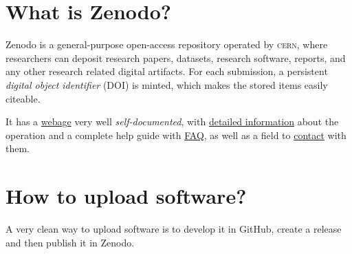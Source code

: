 \section{What is \textsf{Zenodo}?}

Zenodo is a general-purpose open-access repository operated by \textsc{cern}, where researchers can deposit research papers, datasets, research software, reports, and any other research related digital artifacts. For each submission, a persistent \textit{digital object identifier} (DOI) is minted, which makes the stored items easily citeable.

It has a \href{https://zenodo.org/}{webage} very well \textit{self-documented}, with \href{https://about.zenodo.org/}{detailed information} about the operation and a complete help guide with \href{https://help.zenodo.org/}{FAQ}, as well as a field to \href{https://zenodo.org/support}{contact} with them.

\section{How to upload software?}

A very clean way to upload software is to develop it in \textsf{GitHub}, create a release and then publish it in Zenodo.


